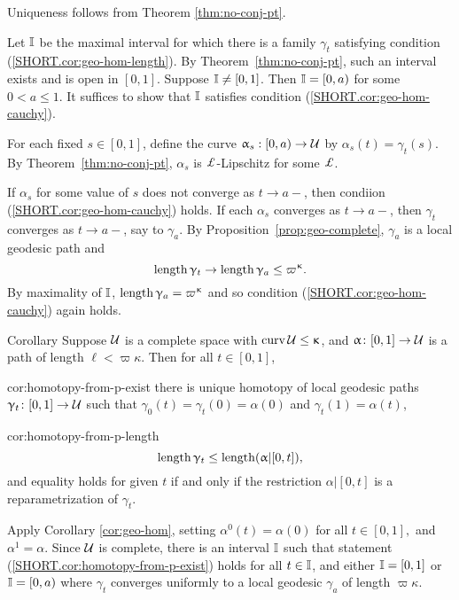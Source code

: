  Uniqueness follows from  Theorem \ref{thm:no-conj-pt}.

Let $\mathbb{I}$ be the maximal interval for which there is a family $\gamma_t$ satisfying condition (\ref{SHORT.cor:geo-hom-length}). 
By Theorem~\ref{thm:no-conj-pt}, such an interval exists and is open in $[0,1]$.  Suppose $\mathbb{I}\ne[0,1]$. Then  $\mathbb{I}=[0,a)$ for some $0<a\le 1$.  It suffices to show that $\mathbb{I}$ satisfies condition (\ref{SHORT.cor:geo-hom-cauchy}).

For each fixed $s\in [0,1]$, define the curve $\alpha_s:[0,a)\to\spc{U}$ by $\alpha_s(t)=\gamma_t(s)$. 
By Theorem~\ref{thm:no-conj-pt}, 
$\alpha_s$ is $ \Lip$-Lipschitz for some $\Lip$.  

If $\alpha_s$  for some value of $s$ does not converge as $t\to a-$, then condiion (\ref{SHORT.cor:geo-hom-cauchy}) holds.  If each $\alpha_s$  converges as $t\to a-$,  
 then $ \gamma_t$ converges as $t\to a-$, say to $\gamma_a$.
By  Proposition~\ref{prop:geo-complete}, $\gamma_a$ is a local geodesic path and\[\length\gamma_t\to\length\gamma_a\le \varpi\kappa.\]
By maximality of $\mathbb{I}$, $\length\gamma_a=\varpi\kappa$ and so condition (\ref{SHORT.cor:geo-hom-cauchy}) again holds.
\qeds
 
  \begin{thm}{Corollary}\label{cor:homotopy-from-p}
Suppose $\mathcal{U}$ is a complete space with $\curv\spc{U}\le\kappa$,
and $\alpha\:[0,1]\to \spc{U}$ is a path of length $\ell<\varpi\kappa$.
Then  for all $t\in[0,1]$,

\begin{subthm}{cor:homotopy-from-p-exist}
there is unique homotopy of local geodesic paths $\gamma_t\:[0,1]\to \spc{U}$
such that $\gamma_0(t)=\gamma_t(0)=\alpha(0)$ and $\gamma_t(1)=\alpha(t)$,
\end{subthm}

\begin{subthm}{cor:homotopy-from-p-length}
\[\length\gamma_t\le\length(\alpha|[0,t]),\]
and  equality holds for given $t$ if and only if the restriction $\alpha|[0,t]$ is a reparametrization of $\gamma_t$.
\end{subthm}
\end{thm}

Apply Corollary \ref{cor:geo-hom}, setting $\alpha^0(t)=\alpha(0)$ for all $t\in [0,1],$ and $\alpha^1=\alpha$. Since $\mathcal{U}$ is complete,  there is an interval $\mathbb{I}$ such that statement (\ref{SHORT.cor:homotopy-from-p-exist}) holds for all $t\in\II$, and either $\mathbb{I}=[0,1]$ or $\mathbb{I}=[0,a)$ where $\gamma_t$ converges uniformly to a local geodesic $\gamma_a$ of length $\varpi\kappa$.

